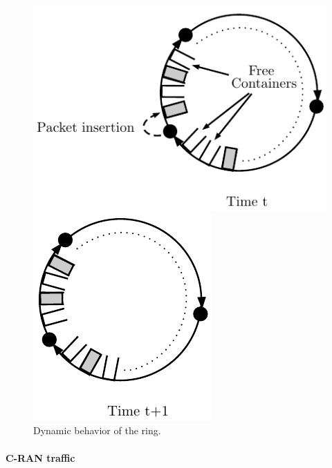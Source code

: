 \documentclass[10pt, conference, letterpaper]{IEEEtran}
\begin{document}
  \begin{figure}[h!]

        \begin{center}
      \hspace{-2.3cm}\includegraphics[scale=0.7]{containers}
   
   \vspace{0.5cm}
   
      \includegraphics[scale=0.7]{containers2}
      \end{center} 

   
     \caption{Dynamic behavior of the ring.}\label{fig:containers}

  \end{figure}
  
     \paragraph{C-RAN traffic}
   
\end{document}
